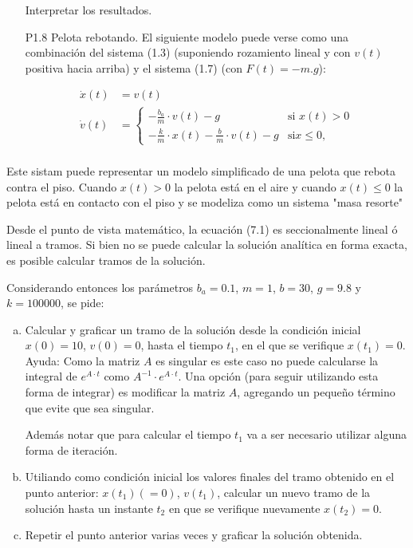 \documentclass{article}
\begin{document}
\begin{itemize}
Interpretar los resultados.




   \item[P1.8] Pelota rebotando. El siguiente modelo puede verse como una combinación del sistema (1.3) (suponiendo rozamiento lineal y con $v(t)$ positiva hacia arriba) y el sistema (1.7) (con $F(t)=-m.g$):

\begin{align*}
  \dot{x}(t) &= v(t) \\
 \label{P1.8a} \tag{P1.8a}
  \dot{v}(t) &=   \begin{cases}
    -\frac{b_{a}}{m} \cdot v(t) - g & \text{si } x(t) > 0\\
    -\frac{k}{m} \cdot x(t) - \frac{b}{m} \cdot v(t) - g & \text {si} x \leq 0,
  \end{cases}\\
\end{align*}
\end{itemize}

Este sistam puede representar un modelo simplificado de una pelota que rebota contra el piso. Cuando $x(t) > 0$ la pelota está en el aire y cuando $x(t) \leq 0$ la pelota está en contacto con el piso y se modeliza como un sistema "masa resorte"

Desde el punto de vista matemático, la ecuación (7.1) es seccionalmente lineal ó lineal a tramos. Si bien no se puede calcular la solución analítica en forma exacta, es posible calcular tramos de la solución.

Considerando entonces los parámetros $b_{a} = 0.1$, $m=1$, $b=30$, $g=9.8$ y $k = 100000$, se pide:
\begin{enumerate}[a)]
\item Calcular y graficar un tramo de la solución desde la condición inicial $x(0)=10$, $v(0)=0$, hasta el tiempo $t_{1}$, en el que se verifique $x(t_{1})=0$.
Ayuda: Como la matriz $A$ es singular es este caso no puede calcularse la integral de $e^{A \cdot t}$ como $A^{-1} \cdot e^{A \cdot t}$. Una opción (para seguir utilizando esta forma de integrar) es modificar la matriz $A$, agregando un pequeño término que evite que sea singular.

Además notar que para calcular el tiempo $t_{1}$ va a ser necesario utilizar alguna forma de iteración.

\item Utiliando como condición inicial los valores finales del tramo obtenido en el punto anterior: $x(t_{1})(=0)$, $v(t_{1})$, calcular un nuevo tramo de la solución hasta un instante $t_{2}$ en que se verifique nuevamente $x(t_{2})=0$.

\item Repetir el punto anterior varias veces y graficar la solución obtenida.
\end{enumerate}
\end{document}
